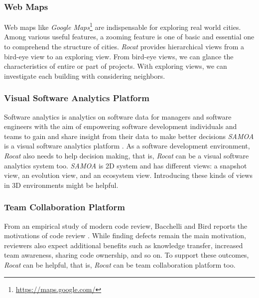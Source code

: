 \documentclass[conference]{IEEEtran}
\begin{document}
\subsubsection{Web Maps}
Web maps like \textit{Google Maps}\footnote{\url{https://maps.google.com/}} are indispensable for exploring real world cities.
Among various useful features, a zooming feature is one of basic and essential one to comprehend the structure of cities.
\textit{Rocat} provides hierarchical views from a bird-eye view to an exploring view.
From bird-eye views, we can glance the characteristics of entire or part of projects.
With exploring views, we can investigate each building with considering neighbors.

\subsubsection{Visual Software Analytics Platform}
Software analytics is analytics on software data for managers and software engineers with the aim of empowering software development individuals and teams to gain and share insight from their data to make better decisions \cite{Menzies:2013:SAS:2553351.2553360} \textit{SAMOA} is a visual software analytics platform \cite{6676936}.
As a software development environment, \textit{Rocat} also needs to help decision making, that is, \textit{Rocat} can be a visual software analytics system too.
\textit{SAMOA} is 2D system and has different views: a snapshot view, an evolution view, and an ecosystem view.
Introducing these kinds of views in 3D environments might be helpful.

\subsubsection{Team Collaboration Platform}
From an empirical study of modern code review, Bacchelli and Bird reports the motivations of code review \cite{Bacchelli:2013:EOC:2486788.2486882}. While finding defects remain the main motivation, reviewers also expect additional benefits such as knowledge transfer, increased team awareness, sharing code ownership, and so on.
To support these outcomes, \textit{Rocat} can be helpful, that is, \textit{Rocat} can be team collaboration platform too.
\end{document}
